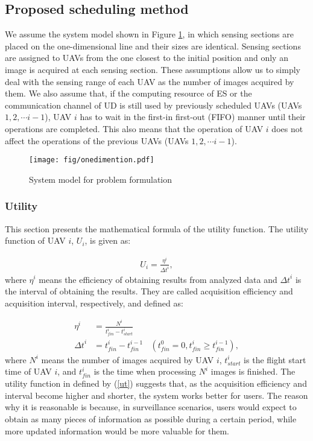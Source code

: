 \documentclass{ieeeaccess}
\begin{document}
\subsection{Proposed scheduling method}\label{math}
We assume the system model shown in Figure  \ref{model1.5}, in which sensing sections are placed on the one-dimensional line and their sizes are identical.
%
Sensing sections are assigned to UAVs from the one closest to the initial position and only an image is acquired at each sensing section.
%
These assumptions allow us to simply deal with the sensing range of each UAV as the number of images acquired by them.
%
We also assume that, if the computing resource of ES or the communication channel of UD is still used by previously scheduled UAVs (UAVs $1, 2, \cdots i-1$), UAV $i$ has to wait in the first-in first-out (FIFO) manner until their operations are completed.
%
This also means that the operation of UAV $i$ does not affect the operations of the previous UAVs (UAVs $1, 2, \cdots i-1$).

\begin{figure}[t]
\begin{center}
\texttt{[image: fig/onedimention.pdf]}
\caption{System model for problem formulation}
\label{model1.5}
\end{center}
\end{figure}

\subsubsection{Utility}\label{to}
This section presents the mathematical formula of the utility function.
%
The utility function of UAV $i$, $U_i$, is given as:

\begin{align}
U_i = \frac{\eta^i}{{\Delta{t}}^i}, \label{ut}
\end{align}
where $\eta^i$ means the efficiency of obtaining results from analyzed data and ${\Delta{t}}^i$ is the interval of obtaining the results.
%
They are called acquisition efficiency and acquisition interval, respectively, and defined as:

\begin{align}
\eta^i&=\frac{N^i}{{t_{fin}^i}-{t_{start}^i}} \label{f1}\\
{\Delta{t}}^i &= {t_{fin}^i}-t_{fin}^{i-1}~~~~(t_ {fin}^0=0, {t_{fin}^i}\geq{t_{fin}^{i-1}}), \label{f2}
\end{align}
where $N^i$ means the number of images acquired by UAV $i$, $t_{start}^i$ is the flight start time of UAV $i$, and $t_{fin}^i$ is the time when processing $N^i$ images is finished.
%
The utility function in defined by (\ref{ut}) suggests that, as the acquisition efficiency and interval become higher and shorter, the system works better for users.
%
The reason why it is reasonable is because, in surveillance scenarios, users would expect to obtain as many pieces of information as possible during a certain period, while more updated information would be more valuable for them.
\end{document}
